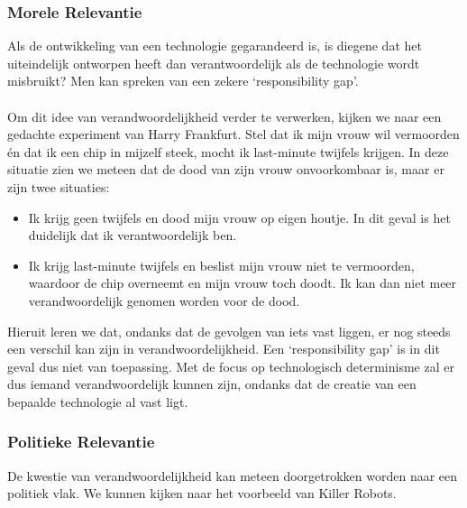\documentclass[../summary.tex]{subfiles}
\begin{document}
	\subsubsection{Morele Relevantie}
	Als de ontwikkeling van een technologie gegarandeerd is, is diegene dat het uiteindelijk ontworpen heeft dan verantwoordelijk als de technologie wordt misbruikt? Men kan spreken van een zekere `responsibility gap'. \\
	\\
	Om dit idee van verandwoordelijkheid verder te verwerken, kijken we naar een gedachte experiment van Harry Frankfurt. Stel dat ik mijn vrouw wil vermoorden én dat ik een chip in mijzelf steek, mocht ik last-minute twijfels krijgen. In deze situatie zien we meteen dat de dood van zijn vrouw onvoorkombaar is, maar er zijn twee situaties:
	\begin{itemize}
		\item Ik krijg geen twijfels en dood mijn vrouw op eigen houtje. In dit geval is het duidelijk dat ik verantwoordelijk ben.
		\item Ik krijg last-minute twijfels en beslist mijn vrouw niet te vermoorden, waardoor de chip overneemt en mijn vrouw toch doodt. Ik kan dan niet meer verandwoordelijk genomen worden voor de dood.
	\end{itemize}
	Hieruit leren we dat, ondanks dat de gevolgen van iets vast liggen, er nog steeds een verschil kan zijn in verandwoordelijkheid. Een `responsibility gap' is in dit geval dus niet van toepassing. Met de focus op technologisch determinisme zal er dus iemand verandwoordelijk kunnen zijn, ondanks dat de creatie van een bepaalde technologie al vast ligt.
	
	\subsubsection{Politieke Relevantie}
	 De kwestie van verandwoordelijkheid kan meteen doorgetrokken worden naar een politiek vlak. We kunnen kijken naar het voorbeeld van Killer Robots.
	
\end{document}
